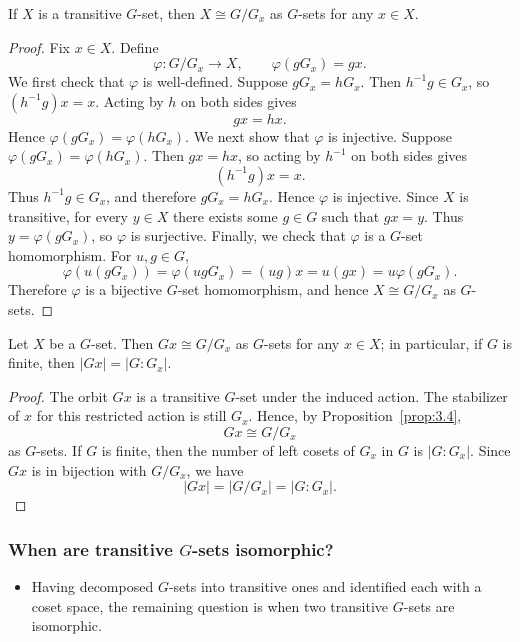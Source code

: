 \documentclass[../Odyssey_Project.tex]{subfiles}
\begin{document}
\begin{proposition}
\label{prop:3.4}
If $X$ is a transitive $G$-set, then $X \cong G/G_x$ as $G$-sets for any $x \in X$.
\end{proposition}

\begin{proof}
    Fix $x \in X$. Define
    \[
        \varphi \colon G/G_x \to X, \qquad \varphi(gG_x) = gx.
    \]
    We first check that $\varphi$ is well-defined. Suppose $gG_x = hG_x$. Then $h^{-1}g \in G_x$, so $(h^{-1}g)x = x$. Acting by $h$ on both sides gives
    \[
        gx = hx.
    \]
    Hence $\varphi(gG_x) = \varphi(hG_x)$.
    We next show that $\varphi$ is injective. Suppose $\varphi(gG_x) = \varphi(hG_x)$. Then $gx = hx$, so acting by $h^{-1}$ on both sides gives
    \[
        (h^{-1}g)x = x.
    \]
    Thus $h^{-1}g \in G_x$, and therefore $gG_x = hG_x$. Hence $\varphi$ is injective.
    Since $X$ is transitive, for every $y \in X$ there exists some $g \in G$ such that $gx = y$. Thus $y = \varphi(gG_x)$, so $\varphi$ is surjective.
    Finally, we check that $\varphi$ is a $G$-set homomorphism. For $u,g \in G$,
    \[
        \varphi(u(gG_x)) = \varphi(ugG_x) = (ug)x = u(gx) = u\varphi(gG_x).
    \]
    Therefore $\varphi$ is a bijective $G$-set homomorphism, and hence $X \cong G/G_x$ as $G$-sets.
\end{proof}

\begin{corollary}
\label{cor:3.5}
Let $X$ be a $G$-set. Then $Gx \cong G/G_x$ as $G$-sets for any $x \in X$; in particular, if $G$ is finite, then $|Gx| = |G : G_x|$.
\end{corollary}

\begin{proof}
    The orbit $Gx$ is a transitive $G$-set under the induced action. The stabilizer of $x$ for this restricted action is still $G_x$. Hence, by Proposition~\ref{prop:3.4},
    \[
        Gx \cong G/G_x
    \]
    as $G$-sets.
    If $G$ is finite, then the number of left cosets of $G_x$ in $G$ is $|G : G_x|$. Since $Gx$ is in bijection with $G/G_x$, we have
    \[
        |Gx| = |G/G_x| = |G : G_x|.
    \]
\end{proof}

\subsubsection*{When are transitive $G$-sets isomorphic?}
\begin{itemize}
    \item Having decomposed $G$-sets into transitive ones and identified each with a coset space, the remaining question is when two transitive $G$-sets are isomorphic.
\end{itemize}
\end{document}
